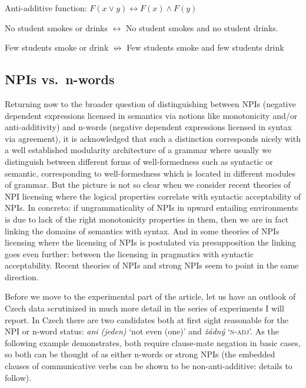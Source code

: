 \documentclass[output=paper,
]{langscibook}
\begin{document}
\ea\label{ex-19} Anti-additive function: $F(x \vee y) \leftrightarrow F(x) \wedge F(y)$
\z

\ea\label{ex-20} No student smokes or drinks $\leftrightarrow$ No student smokes and no student drinks.
\z

\ea\label{ex-21} Few students smoke or drink $\not\leftrightarrow$ Few students smoke and few students drink \label{ex:few}
\z


\subsection{NPIs vs.~n-words}\label{npis-vs.n-words-modularity}

Returning now to the broader question of distinguishing between NPIs (negative dependent expressions licensed in semantics via notions like monotonicity and/or anti-additivity) and n-words (negative dependent expressions licensed in syntax via agreement), it is acknowledged that such a distinction corresponds nicely with a well established modularity architecture of a grammar where usually we  distinguish between different forms of well-formedness such as syntactic or semantic, corresponding to well-formedness which is located in different modules of grammar. But the picture is not so clear when we consider recent theories of NPI licensing where the  logical properties correlate with syntactic acceptability of NPIs. In concreto: if ungrammaticality of NPIs in upward entailing environments is due to lack of the right monotonicity properties in them, then we are in fact linking the domains of semantics with syntax. And in some theories \citep{heim1984note,crnivc2014against} of NPIs licensing where the licensing of NPIs is postulated via presupposition the linking goes even further: between the licensing in pragmatics with syntactic acceptability. Recent theories of NPIs \citep{chierchia2013logic} and strong NPIs \citep{gajewski2011licensing} seem to point in the same direction.

Before we move to the experimental part of the article, let us have an outlook of Czech data scrutinized in much more detail in the series of experiments I will report. In Czech there are two candidates both at first sight reasonable for the NPI or n-word status: \textit{ani (jeden)} `not even (one)' and \textit{žádný} `\textsc{n-adj}'. As the following example demonstrates, both require clause-mate negation in basic cases, so both can be thought of as either n-words or strong NPIs (the embedded clauses of communicative verbs can be shown to be non-anti-additive: details to follow).
\end{document}
